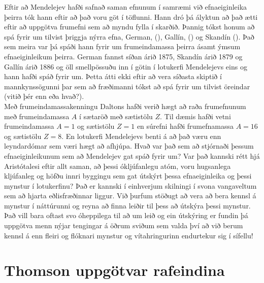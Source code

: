 \ifdefined \wholebook \else\documentclass[oneside]{book}\usepackage{EdlBook}\graphicspath{{figures/}}
\begin{document}
Eftir að Mendelejev hafði safnað saman efnunum í samræmi við efnaeiginleika þeirra tók hann eftir að það voru göt í töflunni. Hann dró þá ályktun að það ætti eftir að uppgötva frumefni sem að myndu fylla í skarðið. Þannig tókst honum að spá fyrir um tilvist þriggja nýrra efna,  German, (), Gallín, () og Skandín (). Það sem meira var þá spáði hann fyrir um frumeindamassa þeirra ásamt ýmsum efnaeiginleikum þeirra. German fannst síðan árið 1875, Skandín árið 1879 og Gallín árið 1886 og öll smellpössuðu inn í götin í lotukerfi Mendelejevs eins og hann hafði spáð fyrir um. Þetta átti ekki eftir að vera síðasta skiptið í mannkynssögunni þar sem að fræðimanni tókst að spá fyrir um tilvist öreindar (vitið þér enn eða hvað?). \\

Með frumeindamassakenningu Daltons hafði verið hægt að raða frumefnunum með frumeindamassa $A$ í sætaröð með sætistölu $Z$. Til dæmis hafði vetni frumeindamassa $A = 1$ og sætistölu $Z = 1$ en súrefni hafði frumefnamassa $A = 16$ og sætistölu $Z = 8$. En lotukerfi Mendelejevs benti á að það væru enn leyndardómar sem væri hægt að afhjúpa. Hvað var það sem að stjórnaði þessum efnaeiginleikunum sem að Mendelejev gat spáð fyrir um?  Var það kannski rétt hjá Aristótalesi eftir allt saman, að þessi ókljúfanlegu atóm, voru hugsanlega kljúfanleg og höfðu innri byggingu sem gat útskýrt þessa efnaeiginleika og þessi mynstur í lotukerfinu? Það er kannski í einhverjum skilningi 
í svona vangaveltum sem að hjarta eðlisfræðinnar liggur. Við þurfum stöðugt að vera að bera kennsl á mynstur í náttúrunni og reyna að finna leiðir til þess að útskýra þessi mynstur. Það vill bara oftast svo óheppilega til að um leið og ein útskýring er fundin þá uppgötva menn nýjar tengingar á öðrum sviðum sem valda því að við berum kennsl á enn fleiri og flóknari mynstur og vítahringurinn endurtekur sig í sífellu! \\

\section{Thomson uppgötvar rafeindina}
\end{document}

